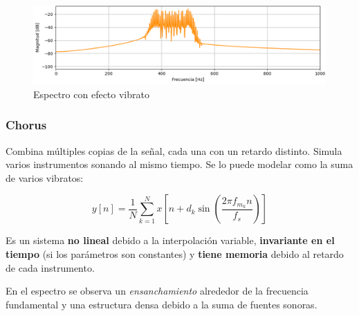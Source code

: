 \documentclass[12pt]{article}
\begin{document}
\begin{figure}[H]
    \centering
    \includegraphics[width=0.75\linewidth]{plot/vibrato_efecto.png}
    \caption{Espectro con efecto vibrato}
    \label{vibrato_efecto}
\end{figure}
\fi

\subsubsection{Chorus}

Combina múltiples copias de la señal, cada una con un retardo distinto.  
Simula varios instrumentos sonando al mismo tiempo.  
Se lo puede modelar como la suma de varios vibratos:

\[
y[n] = \frac{1}{N} \sum_{k=1}^{N} x\!\left[n + d_k \sin\!\left( \frac{2\pi f_{m_k} n}{f_s} \right)\right]
\]

Es un sistema \textbf{no lineal} debido a la interpolación variable,  
\textbf{invariante en el tiempo} (si los parámetros son constantes) y \textbf{tiene memoria} debido al retardo de cada instrumento.  

En el espectro se observa un \textit{ensanchamiento} alrededor de la frecuencia fundamental  
y una estructura densa debido a la suma de fuentes sonoras.

\end{document}
